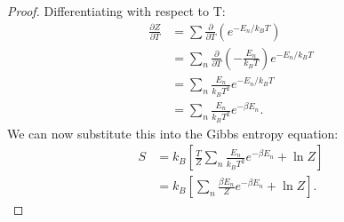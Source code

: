 \documentclass[11pt]{article}
\begin{document}
\begin{proof}
Differentiating with respect to T:
\begin{equation}
    \begin{aligned}
        \frac{\partial Z}{\partial T} &= \sum \frac{\partial}{\partial T} (e^{-E_n/k_BT})\\
        &= \sum_n \frac{\partial }{\partial T} \left(- \frac{E_n}{k_BT} \right)e^{- E_n/k_B T}\\
        &= \sum_n \frac{E_n}{k_B T^2} e^{-E_n/k_BT} \\
        &= \sum_n \frac{E_n}{k_B T^2} e^{-\beta E_n}.
    \end{aligned}
\end{equation}
\newpage
We can now substitute this into the Gibbs entropy equation:
\begin{equation}
    \begin{aligned}
        S &= k_B \left[\frac{T}{Z} \sum_n \frac{E_n}{k_B T^2} e^{-\beta E_n} + \ln Z\right] \\
        &= k_B \left[ \sum_n \frac{\beta E_n}{Z} e^{-\beta E_n} + \ln Z\right].
    \end{aligned}
\end{equation}
\end{proof}
\end{document}
